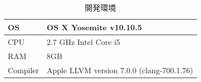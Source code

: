 \begin{table}[h]
	\centering
	\caption{開発環境}
	\label{devEnv}
	\begin{tabular}{|l|l|} \hline
		OS  & OS X Yosemite v10.10.5 \\ \hline
		CPU & 2.7 GHz Intel Core i5 \\ \hline
		RAM & 8GB \\ \hline
		Compiler & Apple LLVM version 7.0.0 (clang-700.1.76) \\ \hline
	\end{tabular}
\end{table}
